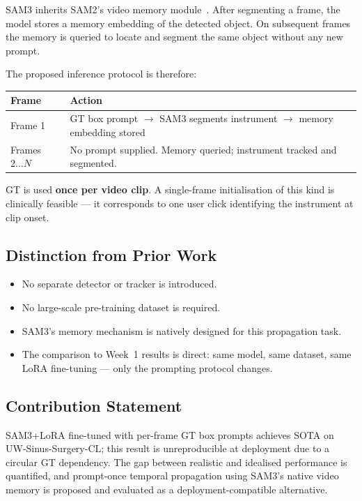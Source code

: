 \documentclass[11pt, a4paper]{article}
\begin{document}
SAM3 inherits SAM2's video memory module~\cite{ravi2024sam2}. After segmenting
a frame, the model stores a memory embedding of the detected object.
On subsequent frames the memory is queried to locate and segment the same
object without any new prompt.

The proposed inference protocol is therefore:

\begin{center}
\begin{tabular}{lp{9cm}}
\toprule
\textbf{Frame} & \textbf{Action} \\
\midrule
Frame 1        & GT box prompt $\to$ SAM3 segments instrument $\to$
                 memory embedding stored \\
Frames $2 \ldots N$ & No prompt supplied. Memory queried; instrument tracked
                      and segmented. \\
\bottomrule
\end{tabular}
\end{center}

GT is used \textbf{once per video clip}. A single-frame initialisation of
this kind is clinically feasible --- it corresponds to one user click
identifying the instrument at clip onset.

\subsection{Distinction from Prior Work}

\begin{itemize}[noitemsep]
    \item No separate detector or tracker is introduced.
    \item No large-scale pre-training dataset is required.
    \item SAM3's memory mechanism is natively designed for this propagation task.
    \item The comparison to Week~1 results is direct: same model, same dataset,
          same LoRA fine-tuning --- only the prompting protocol changes.
\end{itemize}

\subsection{Contribution Statement}

SAM3+LoRA fine-tuned with per-frame GT box prompts achieves SOTA on
UW-Sinus-Surgery-CL; this result is unreproducible at deployment due to a
circular GT dependency. The gap between realistic and idealised performance
is quantified, and prompt-once temporal propagation using SAM3's native
video memory is proposed and evaluated as a deployment-compatible alternative.
\end{document}
